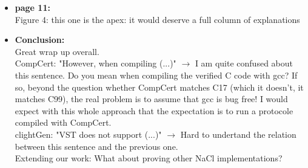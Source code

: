 \begin{itemize}
  \item \textbf{page 11:}\\
    Figure 4: this one is the apex: it would deserve a full column of explanations
\end{itemize}
\begin{answer}
\end{answer}

\begin{itemize}
  \item \textbf{Conclusion:}\\
    Great wrap up overall.\\
    CompCert: "However, when compiling (...)" $\rightarrow$ I am quite confused about this sentence. Do you mean when compiling the verified C code with gcc? If so, beyond the question whether CompCert matches C17 (which it doesn't, it matches C99), the real problem is to assume that gcc is bug free! I would expect with this whole approach that the expectation is to run a protocole compiled with CompCert.\\
    clightGen: "VST does not support (...)" $\rightarrow$ Hard to undertand the relation between this sentence and the previous one.\\
    Extending our work: What about proving other NaCl implementations?
\end{itemize}

\begin{answer}
\end{answer}

